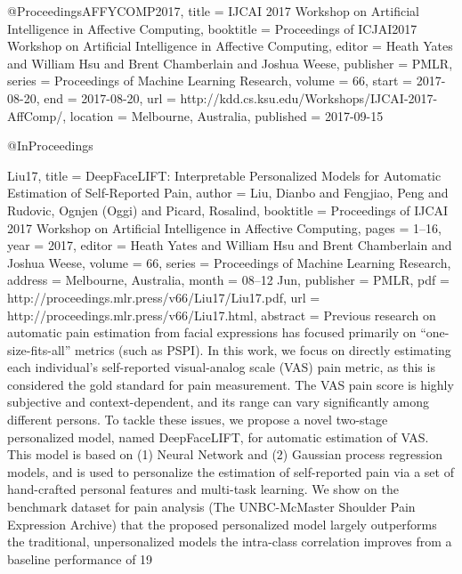 @Proceedings{AFFYCOMP2017,
  title =     {IJCAI 2017 Workshop on Artificial Intelligence in Affective Computing},
  booktitle = {Proceedings of ICJAI2017 Workshop on Artificial Intelligence in Affective Computing},
  editor =    {Heath Yates and William Hsu and Brent Chamberlain and Joshua Weese},
  publisher = {PMLR},
  series =    {Proceedings of Machine Learning Research},
  volume =    66, 
  start = {2017-08-20},
  end = {2017-08-20}, 
  url = {http://kdd.cs.ksu.edu/Workshops/IJCAI-2017-AffComp/},
  location = {Melbourne, Australia}, 
  published = {2017-09-15}
}


@InProceedings{Liu17,
  title = {DeepFaceLIFT: Interpretable Personalized Models for Automatic Estimation of Self-Reported Pain},
  author = {Liu, Dianbo and Fengjiao, Peng and Rudovic, Ognjen (Oggi) and Picard, Rosalind},
  booktitle = {Proceedings of IJCAI 2017 Workshop on Artificial Intelligence in Affective Computing},
  pages = 	 {1--16},
  year = 	 {2017},
  editor =    {Heath Yates and William Hsu and Brent Chamberlain and Joshua Weese},
  volume = 	 {66},
  series = 	 {Proceedings of Machine Learning Research},
  address =  {Melbourne, Australia},
  month = 	 {08--12 Jun},
  publisher = {PMLR},
  pdf = 	 {http://proceedings.mlr.press/v66/Liu17/Liu17.pdf},
  url = 	 {http://proceedings.mlr.press/v66/Liu17.html},
  abstract = {Previous research on automatic pain estimation from facial expressions has focused primarily on “one-size-ﬁts-all” metrics (such as PSPI). In this work, we focus on directly estimating each individual’s self-reported visual-analog scale (VAS) pain metric, as this is considered the gold standard for pain measurement. The VAS pain score is highly subjective and context-dependent, and its range can vary signiﬁcantly among different persons. To tackle these issues, we propose a novel two-stage personalized model, named DeepFaceLIFT, for automatic estimation of VAS. This model is based on (1) Neural Network and (2) Gaussian process regression models, and is used to personalize the estimation of self-reported pain via a set of hand-crafted personal features and multi-task learning. We show on the benchmark dataset for pain analysis (The UNBC-McMaster Shoulder Pain Expression Archive) that the proposed personalized model largely outperforms the traditional, unpersonalized models the intra-class correlation improves from a baseline performance of 19%
}


}
